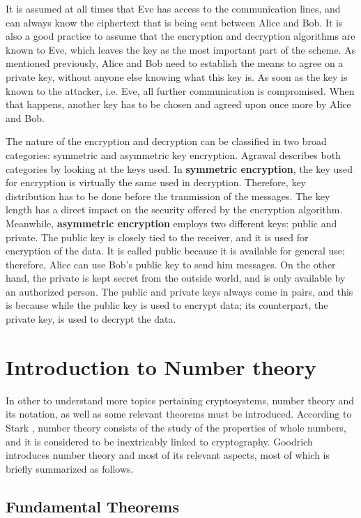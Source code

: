 It is assumed at all times that Eve has access to the communication lines, and can always know the ciphertext that is being sent between Alice and Bob. It is also a good practice to assume that the encryption and decryption algorithms are known to Eve, which leaves the key as the most important part of the scheme. As mentioned previously, Alice and Bob need to establish the means to agree on a private key, without anyone else knowing what this key is. As soon as the key is known to the attacker, i.e. Eve, all further communication is compromised. When that happens, another key has to be chosen and agreed upon once more by Alice and Bob.

The nature of the encryption and decryption can be classified in two broad categories: symmetric and asymmetric key encryption. Agrawal \cite{CryptoKeys} describes both categories by looking at the keys used. In \textbf{symmetric encryption}, the key used for encryption is virtually the same used in decryption. Therefore, key distribution has to be done before the tranmission of the messages. The key length has a direct impact on the security offered by the encryption algorithm. Meanwhile, \textbf{asymmetric encryption} employs two different keys: public and private. The public key is closely tied to the receiver, and it is used for encryption of the data. It is called public because it is available for general use; therefore, Alice can use Bob's public key to send him messages. On the other hand, the private is kept secret from the outside world, and is only available by an authorized person. The public and private keys always come in pairs, and this is because while the public key is used to encrypt data; its counterpart, the private key, is used to decrypt the data. 

\section{Introduction to Number theory}

In other to understand more topics pertaining cryptosystems, number theory and its notation, as well as some relevant theorems must be introduced. According to Stark \cite{stark1970introduction}, number theory consists of the study of the properties of whole numbers, and it is considered to be inextricably linked to cryptography. Goodrich \cite{2008algorithm} introduces number theory and most of its relevant aspects, most of which is briefly summarized as follows.

\subsection{Fundamental Theorems}

